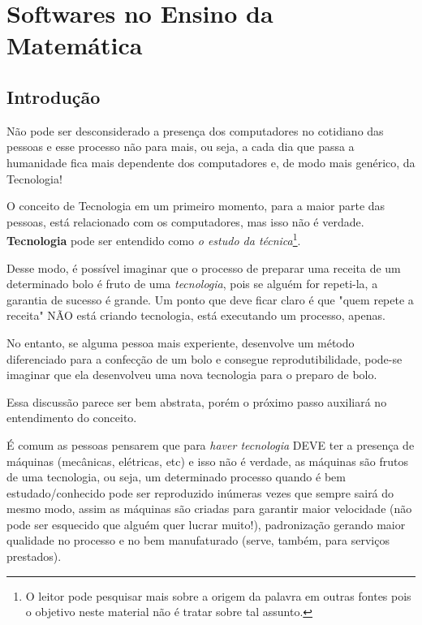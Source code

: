 
\chapter{Softwares no Ensino da Matemática}

\section{Introdução}

\indent Não pode ser desconsiderado a presença dos computadores no cotidiano das pessoas e esse processo não para mais, ou seja, a cada dia que passa a humanidade fica mais dependente dos computadores e, de modo mais genérico, da Tecnologia!

O conceito de Tecnologia em um primeiro momento, para a maior parte das pessoas, está relacionado com os computadores, mas isso não é verdade. \textbf{Tecnologia} pode ser entendido como \textit{o estudo da técnica}\footnote{O leitor pode pesquisar mais sobre a origem da palavra em outras fontes pois o objetivo neste material não é tratar sobre tal assunto.}.

Desse modo, é possível imaginar que o processo de preparar uma receita de um determinado bolo é fruto de uma \textit{tecnologia}, pois se alguém for repeti-la, a garantia de sucesso é grande. Um ponto que deve ficar claro é que "quem repete a receita" NÃO está criando tecnologia, está executando um processo, apenas.

No entanto, se alguma pessoa mais experiente, desenvolve um método diferenciado para a confecção de um bolo e consegue reprodutibilidade, pode-se imaginar que ela desenvolveu uma nova tecnologia para o preparo de bolo.

Essa discussão parece ser bem abstrata, porém o próximo passo auxiliará no entendimento do conceito.

É comum as pessoas pensarem que para \textit{haver tecnologia} DEVE ter a presença de máquinas (mecânicas, elétricas, etc) e isso não é verdade, as máquinas são frutos de uma tecnologia, ou seja, um determinado processo quando é bem estudado/conhecido pode ser reproduzido inúmeras vezes que sempre sairá do mesmo modo, assim as máquinas são criadas para garantir maior velocidade (não pode ser esquecido que alguém quer lucrar muito!), padronização gerando maior qualidade no processo e no bem manufaturado (serve, também, para serviços prestados).

